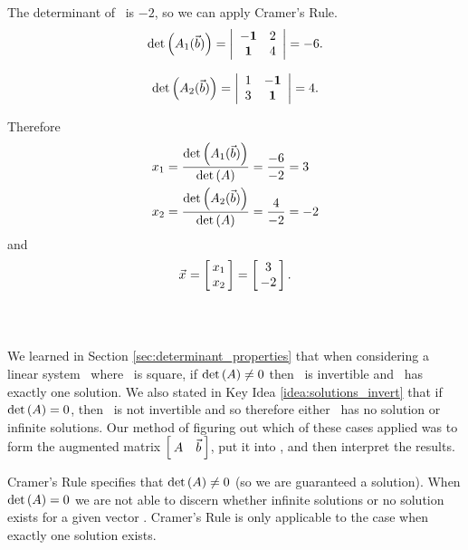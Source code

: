 {The determinant of \tta\ is $-2$, so we can apply Cramer's Rule. 
$$\det{\tta_1(\vb)} = \bdt{cc} {\bf -1} & 2\\ {\bf 1} & 4\edt = -6.$$

$$\det{\tta_2(\vb)} = \bdt{cc} 1 & {\bf -1}\\ 3 & {\bf 1} \edt = 4.$$

Therefore 
\begin{align*}
x_1 &= \frac{\det{\tta_1(\vb)}}{\det{\tta}} = \frac{-6}{-2} = 3\\
x_2 &= \frac{\det{\tta_2(\vb)}}{\det{\tta}} = \frac{4}{-2} = -2\\
\end{align*}
and $$\vx = \bmx{c}x_1\\x_2\emx = \bmx{c}3\\-2\emx.$$ \ } \\ %

We learned in Section \ref{sec:determinant_properties} that when considering a linear system \ttaxb\ where \tta\ is square, if $\det{\tta}\neq 0$ then \tta\ is invertible and \ttaxb\ has exactly one solution. We also stated in Key Idea \ref{idea:solutions_invert} that if $\det{\tta} = 0$, then \tta\ is not invertible and so therefore either \ttaxb\ has no solution or infinite solutions. Our method of figuring out which of these cases applied was to form the augmented matrix $\bmx{cc} \tta & \vb \emx$, put it into \rref, and then interpret the results.

Cramer's Rule specifies that $\det{\tta}\neq 0$ (so we are guaranteed a solution). %
When $\det{\tta}=0$ we are not able to discern whether infinite solutions or no solution exists for a given vector \vb. Cramer's Rule is only applicable to the case when exactly one solution exists. \\


